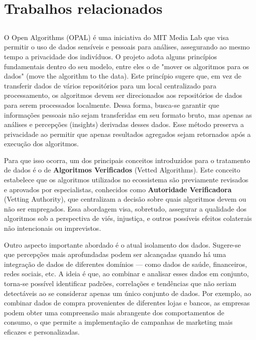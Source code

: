 \chapter{Trabalhos relacionados}

\section{}

O Open Algorithms (OPAL) é uma iniciativa do MIT Media Lab que visa permitir o uso de dados sensíveis e pessoais para análises, assegurando ao mesmo tempo a privacidade dos indivíduos. O projeto adota alguns princípios fundamentais dentro do seu modelo, entre eles o de "mover os algoritmos para os dados" (move the algorithm to the data). Este princípio sugere que, em vez de transferir dados de vários repositórios para um local centralizado para processamento, os algoritmos devem ser direcionados aos repositórios de dados para serem processados localmente. Dessa forma, busca-se garantir que informações pessoais não sejam transferidas em seu formato bruto, mas apenas as análises e percepções (insights) derivadas desses dados. Esse método preserva a privacidade ao permitir que apenas resultados agregados sejam retornados após a execução dos algoritmos.


Para que isso ocorra, um dos principais conceitos introduzidos para o tratamento de dados é o de \textbf{Algoritmos Verificados} (Vetted Algorithms). Este conceito estabelece que os algoritmos utilizados no ecossistema são previamente revisados e aprovados por especialistas, conhecidos como \textbf{Autoridade Verificadora} (Vetting Authority), que centralizam a decisão sobre quais algoritmos devem ou não ser empregados. Essa abordagem visa, sobretudo, assegurar a qualidade dos algoritmos sob a perspectiva de viés, injustiça, e outros possíveis efeitos colaterais não intencionais ou imprevistos.

Outro aspecto importante abordado é o atual isolamento dos dados. Sugere-se que percepções mais aprofundadas podem ser alcançadas quando há uma integração de dados de diferentes domínios — como dados de saúde, financeiros, redes sociais, etc. A ideia é que, ao combinar e analisar esses dados em conjunto, torna-se possível identificar padrões, correlações e tendências que não seriam detectáveis ao se considerar apenas um único conjunto de dados. Por exemplo, ao combinar dados de compra provenientes de diferentes lojas e bancos, as empresas podem obter uma compreensão mais abrangente dos comportamentos de consumo, o que permite a implementação de campanhas de marketing mais eficazes e personalizadas.


